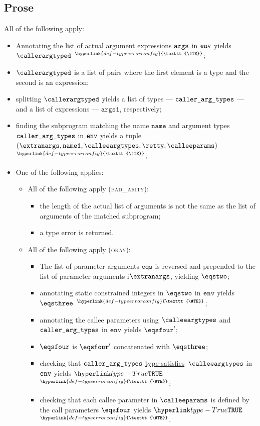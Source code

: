 \documentclass{book}
\newcommand\TypeErrorConfig[0]{\hyperlink{def-typeerrorconfig}{\texttt{\#TE}}}
\newcommand\ProseOrTypeError[0]{\hyperlink{def-proseortypeerror}{$^{\TypeErrorConfig}$}}
\newcommand\typesatisfies[0]{\hyperlink{def-typesatisfies}{type-satisfies}}
\newcommand\eqs[0]{\texttt{eqs}}
\newcommand\nameone[0]{\texttt{name1}}
\newcommand\vargsone[0]{\texttt{args1}}
\newcommand\name[0]{\texttt{name}}
\begin{document}
\subsection{Prose}
All of the following apply:
\begin{itemize}
  \item Annotating the list of actual argument expressions $\texttt{args}$ in $\texttt{env}$ yields $\callerargtyped$ \ProseOrTypeError;
  \item $\callerargtyped$ is a list of pairs where the first element is a type and the second is an expression;
  \item splitting $\callerargtyped$ yields a list of types --- $\texttt{caller\_arg\_types}$ --- and a list of expressions ---
  $\vargsone$, respectively;
  \item finding the subprogram matching the name $\name$ and argument types $\texttt{caller\_arg\_types}$ in $\texttt{env}$
  yields a tuple $(\extranargs, \nameone, \calleeargtypes, \retty, \calleeparams)$ \ProseOrTypeError;
  \item One of the following applies:
  \begin{itemize}
    \item All of the following apply (\textsc{bad\_arity}):
    \begin{itemize}
      \item the length of the actual list of arguments is not the same as the list of arguments of the matched
      subprogram;
      \item a type error is returned.
    \end{itemize}

    \item All of the following apply (\textsc{okay}):
    \begin{itemize}
      \item The list of parameter arguments $\eqs$ is reversed and prepended to the list of parameter arguments
      i$\extranargs$, yielding $\eqstwo$;
      \item annotating static constrained integers in $\eqstwo$ in $\texttt{env}$ yields $\eqsthree$ \ProseOrTypeError;
      \item annotating the callee parameters using $\calleeargtypes$ and $\texttt{caller\_arg\_types}$ in $\texttt{env}$
      yields $\eqsfour'$;
      \item $\eqsfour$ is $\eqsfour'$ concatenated with $\eqsthree$;
      \item checking that $\texttt{caller\_arg\_types}$ \typesatisfies\ $\calleeargtypes$ in $\texttt{env}$ yields
      $\True$ \ProseOrTypeError;
      \item checking that each callee parameter in $\calleeparams$ is defined by the call
      parameters $\eqsfour$ yields $\True$ \ProseOrTypeError.
    \end{itemize}
  \end{itemize}
\end{itemize}
\end{document}
